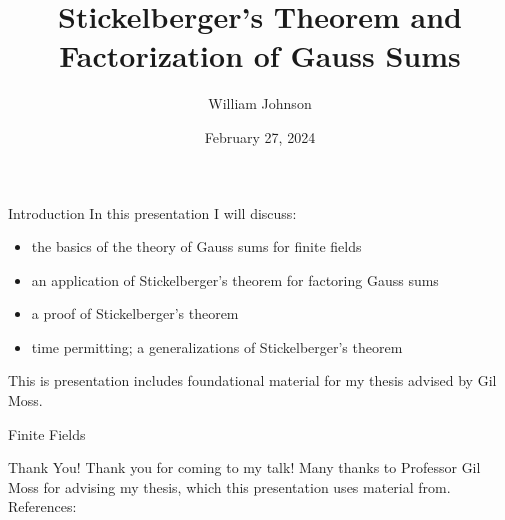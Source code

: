 \documentclass[presentation, t]{beamer}
\title[] %
{Stickelberger's Theorem and Factorization of Gauss Sums
}
\author[WJ]
{William Johnson
}
\institute[2024] 
{
 University of Maine
}
\date[Thesis 2024]
{February 27, 2024}
\begin{document}
\frame{\titlepage}


\begin{frame}{Introduction}
\bigskip
In this presentation I will discuss:
\begin{itemize}
    \item the basics of the theory of Gauss sums for finite fields
    \item an application of Stickelberger's theorem for factoring Gauss sums
    \item a proof of Stickelberger's theorem 
    \item time permitting; a generalizations of Stickelberger's theorem
\end{itemize}
\bigskip
This is presentation includes foundational material for my thesis advised by Gil Moss. 
\end{frame}


\begin{frame}{Finite Fields}
\end{frame}


\begin{frame}{Thank You!}
Thank you for coming to my talk! Many thanks to Professor Gil Moss for advising my thesis, which this presentation uses material from.\\
\medskip
References:
\medskip
    

\end{frame}
\end{document}
